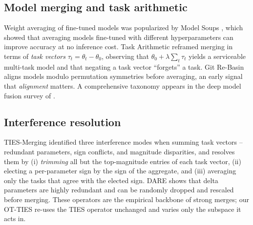 \documentclass[11pt]{article}
\newcommand{\otties}{\textsc{OT-TIES}}
\begin{document}
\subsection{Model merging and task arithmetic}
Weight averaging of fine-tuned models was popularized by Model Soups \citep{wortsman2022soups}, which
showed that averaging models fine-tuned with different hyperparameters can improve accuracy at no
inference cost. Task Arithmetic \citep{ilharco2023task} reframed merging in terms of \emph{task
vectors} $\tau_t = \theta_t - \theta_0$, observing that $\theta_0 + \lambda \sum_t \tau_t$ yields a
serviceable multi-task model and that negating a task vector ``forgets'' a task. Git Re-Basin
\citep{ainsworth2023rebasin} aligns models modulo permutation symmetries before averaging, an early
signal that \emph{alignment} matters. A comprehensive taxonomy appears in the deep model fusion survey
of \citet{li2023deepfusion}.

\subsection{Interference resolution}
TIES-Merging \citep{yadav2023ties} identified three interference modes when summing task vectors --
redundant parameters, sign conflicts, and magnitude disparities, and resolves them by
(i) \emph{trimming} all but the top-magnitude entries of each task vector, (ii) electing a per-parameter
sign by the sign of the aggregate, and (iii) averaging only the tasks that agree with the elected sign.
DARE \citep{yu2024dare} shows that delta parameters are highly redundant and can be randomly dropped and
rescaled before merging. These operators are the empirical backbone of strong merges; our \otties{}
re-uses the TIES operator unchanged and varies only the subspace it acts in.
\end{document}
